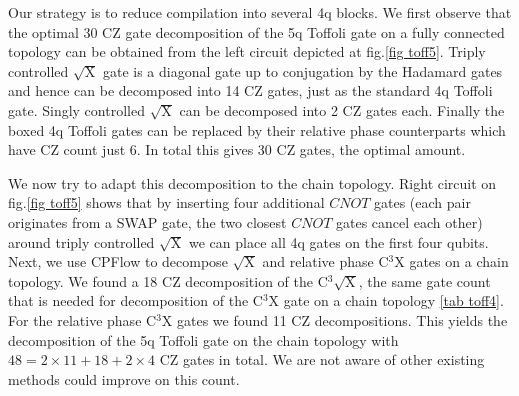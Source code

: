 \documentclass[amsfonts, amssymb, aps, nofootinbib, twocolumn]{revtex4-2}
\newcommand{\CZ}{CZ }
\newcommand{\CX}{CNOT }
\newcommand{\cx}[1]{C${}^{#1}$X}
\newcommand{\package}[1]{\textrm {#1 }}
\newcommand{\cpflow}{\package{CPFlow}}
\begin{document}
Our strategy is to reduce compilation into several 4q blocks. We first observe that the optimal 30 \CZ gate decomposition of the 5q Toffoli gate on a fully connected topology can be obtained from the left circuit depicted at fig.\eqref{fig toff5}. Triply controlled $\sqrt{\text{X}}$ gate is a diagonal gate up to conjugation by the Hadamard gates and hence can be decomposed into 14 \CZ gates, just as the standard 4q Toffoli gate. Singly controlled $\sqrt{\text{X}}$ can be decomposed into 2 \CZ gates each. Finally the boxed 4q Toffoli gates can be replaced by their relative phase counterparts \cite{Maslov} which have \CZ count just 6. In total this gives 30 \CZ gates, the optimal amount. 

We now try to adapt this decomposition to the chain topology. Right circuit on fig.\ref{fig toff5} shows that by inserting four additional $\CX$ gates (each pair originates from a SWAP gate, the two closest $\CX$ gates cancel each other) around triply controlled $\sqrt{\text{X}}$ we can place all 4q gates on the first four qubits. Next, we use \cpflow to decompose $\sqrt{\text{X}}$ and relative phase \cx{3} gates on a chain topology. We found a 18 \CZ decomposition of the C${}^{3}\sqrt{\text{X}}$, the same gate count that is needed for decomposition of the \cx{3} gate on a chain topology \ref{tab toff4}. For the relative phase \cx{3} gates we found 11 \CZ decompositions. This yields the decomposition of the 5q Toffoli gate on the chain topology with $48=2\times 11+18+2\times4$ \CZ gates in total. We are not aware of other existing methods could improve on this count.
\end{document}
